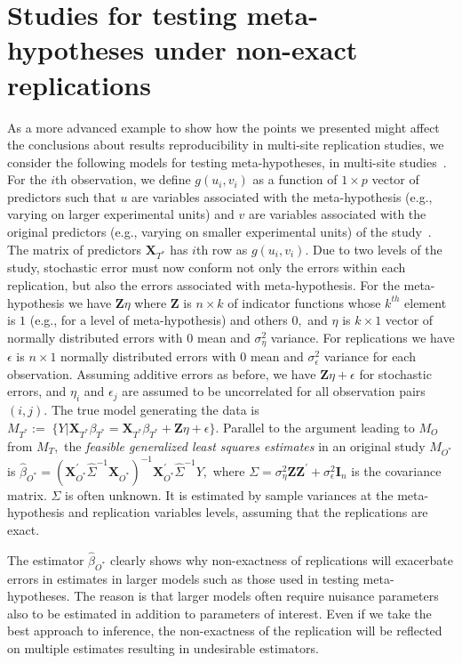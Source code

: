 \documentclass[meta,authordate]{jote-new-article}
\newcommand{\X}{\mathbf{X}}
\newcommand{\Z}{\mathbf{Z}}
\newcounter{result}
\begin{document}
\section{Studies for testing meta-hypotheses under non-exact replications}

As a more advanced example to show how the points we presented might affect the conclusions about results reproducibility in multi-site replication studies, we consider the following models for testing meta-hypotheses, in multi-site studies~\parencite[e.g., author involvement effect tested in Many Labs 4,][]{klein2022many}. For the $i$th observation, we define $g(u_i, v_i)$ as a function of $1 \times p$ vector of predictors such that $u$ are variables associated with the meta-hypothesis (e.g., varying on larger experimental units) and $v$ are variables associated with the original predictors (e.g., varying on smaller experimental units) of the study~\parencite{jones2009split}. The matrix of predictors $\X_{T^*}$ has $i$th row as $g(u_i, v_i).$ Due to two levels of the study, stochastic error must now conform not only the errors within each replication, but also the errors associated with meta-hypothesis. For the meta-hypothesis we have $\Z\eta$ where $\Z$ is $n \times k$ of indicator functions whose $k^{th}$ element is $1$ (e.g., for a level of meta-hypothesis) and others $0,$ and $\eta$ is $k \times 1$ vector of normally distributed errors with 0 mean and $\sigma_{\eta}^2$ variance. For replications we have $\epsilon$ is $n \times 1$ normally distributed errors with 0 mean and $\sigma_{\epsilon}^2$ variance for each observation. Assuming additive errors as before, we have $\Z\eta+\epsilon$ for stochastic errors, and $\eta_i$ and $\epsilon_j$ are assumed to be uncorrelated for all observation pairs $(i,j).$ The true model generating the data is
%
$M_{T^*}:=\; \{Y|\X_{T^*}\beta_{T^*} =\X_{T^*}\beta_{T^*}+\Z\eta+\epsilon\}.
$
%
Parallel to the argument leading to $M_O$ from $M_T,$
the {\em feasible generalized least squares estimates} in an original study $M_{O^*}$ is
%
$
  \hat{\beta}_{O^*} = (\X_{O^*}^{'}\widehat{\Sigma}^{-1}\X_{O^*})^{-1}\X_{O^*}^{'} \widehat{\Sigma}^{-1}Y,
$
%
where
$\Sigma=\sigma_{\eta}^2 \Z \Z^{'}+\sigma_{\epsilon}^2\mathbf{I}_{n}$
is the covariance matrix. $\Sigma$ is often unknown. It is estimated by sample variances at the meta-hypothesis and replication variables levels, assuming that the replications are exact.

The estimator $\hat{\beta}_{O^*}$ clearly shows why non-exactness of replications will exacerbate errors in estimates in larger models such as those used in testing meta-hypotheses. The reason is that larger models often require nuisance parameters also to be estimated in addition to parameters of interest. Even if we take the best approach to inference, the non-exactness of the replication will be reflected on multiple estimates resulting in undesirable estimators.
\end{document}
